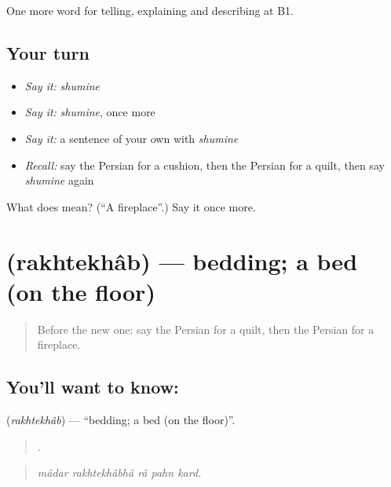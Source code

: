 \begin{grammarlens}[title={What you've built}]
One more word for telling, explaining and describing at B1.
\end{grammarlens}

\subsection*{Your turn}
\begin{itemize}
\raggedright
  \item \emph{Say it:} \emph{shumine}
  \item \emph{Say it:} \emph{shumine}, once more
  \item \emph{Say it:} a sentence of your own with \emph{shumine}
  \item \emph{Recall:} say the Persian for a cushion, then the Persian for a quilt, then say \emph{shumine} again
\end{itemize}

\begin{tcolorbox}[breakable,colback=teal!4,colframe=teal!35!black,title={Before you move on}]
What does  mean? (\textquotedblleft{}A fireplace\textquotedblright{}.) Say it once more.
\end{tcolorbox}
\section[\texorpdfstring{\fa{رختخواب} (rakhtekhâb)}{رختخواب (rakhtekhâb)}]{ (rakhtekhâb) — bedding; a bed (on the floor)}

\label{lesson:FA-C535-rakhtekhab}



\begin{quote}
Before the new one: say the Persian for a quilt, then the Persian for a fireplace.
\end{quote}

\subsection*{You'll want to know: }
\textbf{} (\emph{rakhtekhâb}) — \textquotedblleft{}bedding; a bed (on the floor)\textquotedblright{}.

\begin{quote}
    .
\end{quote}

\begin{quote}
\emph{mâdar rakhtekhâbhâ râ pahn kard.}
\end{quote}

